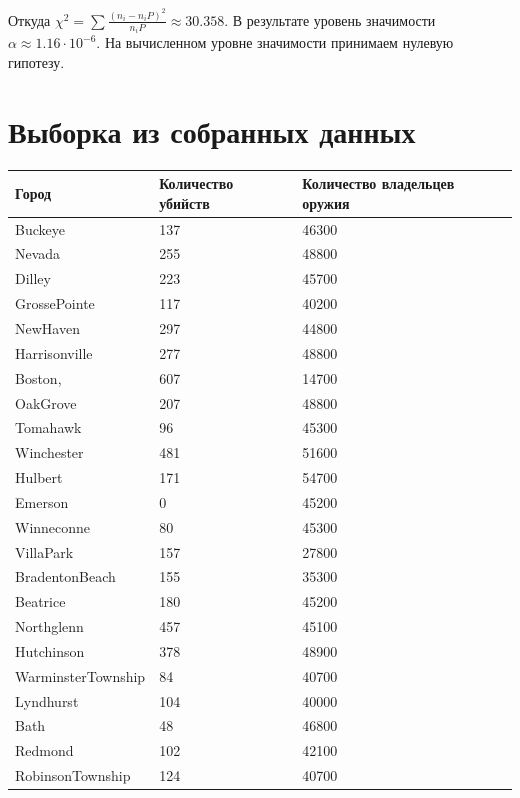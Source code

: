 \documentclass[titlepage]{article}
\begin{document}
Откуда $\chi^2 = \sum \frac{(n_i - n_i P)^2}{n_i P} \approx 30.358$. В результате уровень значимости $\alpha \approx 1.16 \cdot 10^{-6}$. На вычисленном уровне значимости принимаем нулевую гипотезу.

\clearpage
\appendix
\section{Выборка из собранных данных}
\label{sec:appendix}
\begin{table}[!ht]
    \centering
    \begin{tabular}{|l|l|l|}
    \hline
        Город & Количество убийств & Количество владельцев оружия \\ \hline
        Buckeye & 137 & 46300 \\ \hline
        Nevada & 255 & 48800 \\ \hline
        Dilley & 223 & 45700 \\ \hline
        GrossePointe & 117 & 40200 \\ \hline
        NewHaven & 297 & 44800 \\ \hline
        Harrisonville & 277 & 48800 \\ \hline
        Boston, & 607 & 14700 \\ \hline
        OakGrove & 207 & 48800 \\ \hline
        Tomahawk & 96 & 45300 \\ \hline
        Winchester & 481 & 51600 \\ \hline
        Hulbert & 171 & 54700 \\ \hline
        Emerson & 0 & 45200 \\ \hline
        Winneconne & 80 & 45300 \\ \hline
        VillaPark & 157 & 27800 \\ \hline
        BradentonBeach & 155 & 35300 \\ \hline
        Beatrice & 180 & 45200 \\ \hline
        Northglenn & 457 & 45100 \\ \hline
        Hutchinson & 378 & 48900 \\ \hline
        WarminsterTownship & 84 & 40700 \\ \hline
        Lyndhurst & 104 & 40000 \\ \hline
        Bath & 48 & 46800 \\ \hline
        Redmond & 102 & 42100 \\ \hline
        RobinsonTownship & 124 & 40700 \\ \hline

\end{tabular}
\end{table}
\end{document}
